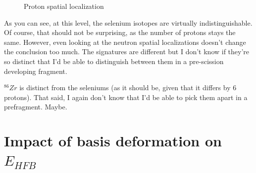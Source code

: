 \documentclass[]{report}
\begin{document}
\begin{figure}
  \begin{center}
    \label{fig:86Zr-p-locali}
    \label{fig:84Se-p-locali}
    \label{fig:82Se-p-locali}
  \end{center}
  \caption{Proton spatial localization}
\end{figure}


As you can see, at this level, the selenium isotopes are virtually indistinguishable. Of course, that should not be surprising, as the number of protons stays the same. However, even looking at the neutron spatial localizations doesn't change the conclusion too much. The signatures are different but I don't know if they're so distinct that I'd be able to distinguish between them in a pre-scission developing fragment.

$^{86}Zr$ is distinct from the seleniums (as it should be, given that it differs by 6 protons). That said, I again don't know that I'd be able to pick them apart in a prefragment. Maybe.

\section*{Impact of basis deformation on $E_{HFB}$}
\end{document}
